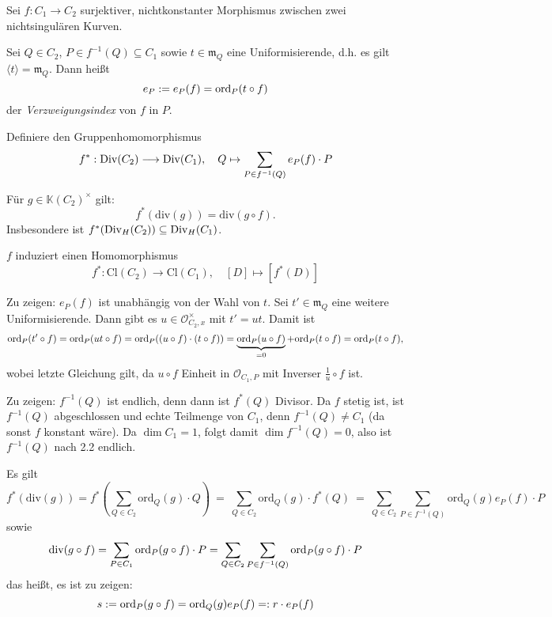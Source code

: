 \documentclass[11pt]{book}
\theoremstyle{nonumberbreak}
\newenvironment{pr}[1][]{\ifthenelse{\equal{#1}{}}{\proof}{\proof[#1]}\rm}{\endproof}
\newenvironment{bemdefin}[1][]{\ifthenelse{\equal{#1}{}}{\bemdefini}{\bemdefini[#1]}\rm}{\endbemdefini}
\begin{document}
\begin{spacing}{1.3}
\begin{bemdefin}
Sei $f: C_1 \longrightarrow C_2$ surjektiver, nichtkonstanter Morphismus zwischen zwei nichtsingulären Kurven.
\begin{compactenum}
\item Sei $Q \in C_2$, $P \in f^{-1}(Q) \subseteq C_1$ sowie $t \in \mathfrak{m}_Q$ eine Uniformisierende, d.h. es gilt $\langle t \rangle = \mathfrak{m}_Q$. Dann heißt
$$e_P:= e_P (f) = \textrm{ord}_P(t \circ f)$$
der \textit{Verzweigungsindex} von $f$ in $P$. 
\item Definiere den Gruppenhomomorphismus
$$f^{*}: \textrm{Div} (C_2) \longrightarrow \textrm{Div}(C_1), \quad Q \mapsto \sum_{P \in f^{-1}(Q)} e_P(f) \cdot P$$
\item Für $g \in \mathbb{K}(C_2)^{\times}$ gilt:
$$f^{*}\left( \textrm{div}(g)\right) = \textrm{div}( g \circ f).$$
Insbesondere ist $f^{*}( \textrm{Div} _H (C_2)) \subseteq \textrm{Div} _H (C_1)$.
\item $f$ induziert einen Homomorphismus
$$f^{*}: \textrm{Cl}(C_2) \longrightarrow \textrm{Cl}(C_1), \quad [D] \mapsto [f^{*}(D)]$$
\end{compactenum}
\begin{pr}
\begin{compactenum}
\item Zu zeigen: $e_P(f)$ ist unabhängig von der Wahl von $t$. Sei $t' \in \mathfrak{m}_Q$ eine weitere Uniformisierende. Dann gibt es $u \in \mathcal{O}_{C_2,x}^{\times}$ mit $t'= ut$. Damit ist 
$$\textrm{ord}_P (t' \circ f) = \textrm{ord}_P (ut \circ f) = \textrm{ord}_P ( (u \circ f) \cdot (t \circ f)) = \underbrace{\textrm{ord}_P (u \circ f)}_{=0} +\textrm{ord}_P(t \circ f) = \textrm{ord}_P (t \circ f),$$
wobei letzte Gleichung gilt, da $u \circ f$ Einheit in $\mathcal{O}_{C_1, P}$ mit Inverser $\frac{1}{u} \circ f$ ist.
\item Zu zeigen: $f^{-1}(Q)$ ist endlich, denn dann ist $f^{*}(Q)$ Divisor. Da $f$ stetig ist, ist $f^{-1}(Q)$ abgeschlossen und echte Teilmenge von $C_1$, denn $f^{-1}(Q) \neq C_1$ (da sonst $f$ konstant wäre). Da $\dim C_1 =1$, folgt damit $\dim f^{-1}(Q) =0$, also ist $f^{-1}(Q)$ nach 2.2 endlich.
\item Es gilt
$$f^{*}\left(\textrm{div}(g)\right) = f^{*} \left( \sum_{Q \in C_2} \textrm{ord}_Q (g) \cdot Q \right) \ = \ \sum_{Q \in C_2} \textrm{ord}_Q (g) \cdot f^{*}(Q)\ = \ \sum_{Q \in C_2} \sum_{P \in f^{-1}(Q)} \textrm{ord}_Q (g) e_P (f) \cdot P$$
sowie
$$\textrm{div}(g \circ f) = \sum_{P \in C_1} \textrm{ord}_P (g \circ f) \cdot P = \sum_{Q \in C_2} \sum_{P \in f^{-1}(Q)} \textrm{ord}_P ( g \circ f) \cdot P$$
das heißt, es ist zu zeigen:
$$s:= \textrm{ord}_P( g \circ f) = \textrm{ord}_Q (g) e_P(f) =: r \cdot e_P(f)$$

\end{compactenum}
\end{pr}
\end{bemdefin}
\end{spacing}
\end{document}
